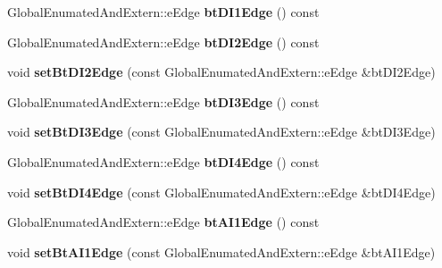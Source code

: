 \begin{DoxyCompactItemize}
\mbox{\label{class_trigger_functions_a17be094487b2f928664f891bff1efa96}} 
Global\+Enumated\+And\+Extern\+::e\+Edge {\bfseries bt\+D\+I1\+Edge} () const
\item 
\mbox{\label{class_trigger_functions_ac37ab3aa60cf1ad0f90e736e484f21cf}} 
Global\+Enumated\+And\+Extern\+::e\+Edge {\bfseries bt\+D\+I2\+Edge} () const
\item 
\mbox{\label{class_trigger_functions_abb8241922e61006f2e6b327c2d6056b2}} 
void {\bfseries set\+Bt\+D\+I2\+Edge} (const Global\+Enumated\+And\+Extern\+::e\+Edge \&bt\+D\+I2\+Edge)
\item 
\mbox{\label{class_trigger_functions_aa22c30b4fc17e092480dbbc7d42229d8}} 
Global\+Enumated\+And\+Extern\+::e\+Edge {\bfseries bt\+D\+I3\+Edge} () const
\item 
\mbox{\label{class_trigger_functions_ae71f8dad707a4c96fe65717106c45a26}} 
void {\bfseries set\+Bt\+D\+I3\+Edge} (const Global\+Enumated\+And\+Extern\+::e\+Edge \&bt\+D\+I3\+Edge)
\item 
\mbox{\label{class_trigger_functions_a26473065ac6521d1f25475e3b98a9572}} 
Global\+Enumated\+And\+Extern\+::e\+Edge {\bfseries bt\+D\+I4\+Edge} () const
\item 
\mbox{\label{class_trigger_functions_af7fc6f2c22d5b280a396300a89c57d49}} 
void {\bfseries set\+Bt\+D\+I4\+Edge} (const Global\+Enumated\+And\+Extern\+::e\+Edge \&bt\+D\+I4\+Edge)
\item 
\mbox{\label{class_trigger_functions_a800d4f35ee3c2f8984ab52a5f99ce928}} 
Global\+Enumated\+And\+Extern\+::e\+Edge {\bfseries bt\+A\+I1\+Edge} () const
\item 
\mbox{\label{class_trigger_functions_a3cb846cf2bf70d9af63719e1bd5c3baa}} 
void {\bfseries set\+Bt\+A\+I1\+Edge} (const Global\+Enumated\+And\+Extern\+::e\+Edge \&bt\+A\+I1\+Edge)
\item 
\mbox{\label{class_trigger_functions_a6fbccad22d4f5b7a593dac5a15d1939b}} 

\end{DoxyCompactItemize}
